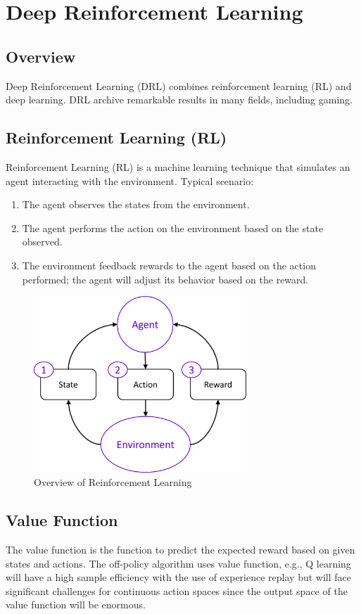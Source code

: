 \chapter{Deep Reinforcement Learning}
\section{Overview}
Deep Reinforcement Learning (DRL) combines reinforcement learning (RL) and deep learning. DRL archive remarkable results in many fields, including gaming. 

\section{Reinforcement Learning (RL)}
Reinforcement Learning (RL) is a machine learning technique that simulates an agent interacting with the environment. Typical scenario:
    \begin{enumerate}
        \item The agent observes the states from the environment.
        \item The agent performs the action on the environment based on the state observed.
        \item The environment feedback rewards to the agent based on the action performed; the agent will adjust its behavior based on the reward. 
    \end{enumerate}
\begin{figure}[ht]
  \centering\includegraphics[width=8cm]{images/rl_overview.png}
  \caption [Overview of Reinforcement Learning]
  {Overview of Reinforcement Learning
  }
  \label{fig:rl_overview_diagram}
\end{figure}

\section{Value Function}
The value function is the function to predict the expected reward based on given states and actions. The off-policy algorithm uses value function, e.g., Q learning will have a high sample efficiency with the use of experience replay but will face significant challenges for continuous action spaces since the output space of the value function will be enormous.

